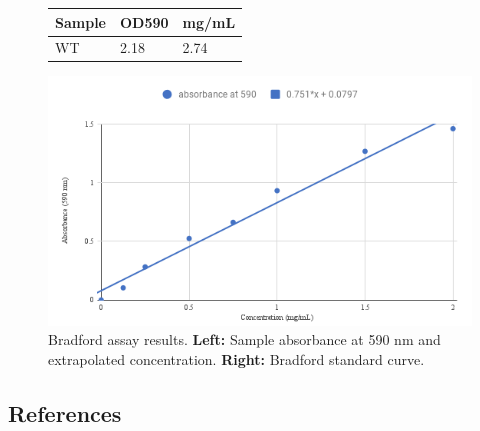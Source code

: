 \documentclass[journal=jacsat,manuscript=article]{achemso}
\begin{document}
\begin{figure}
  \centering
  \begin{minipage}{.4\textwidth}
    \begin{tabular}{lll}
      \hline
      Sample  & OD590 & mg/mL  \\
      \hline
      WT        & 2.18 & 2.74\\
      \hline
    \end{tabular}
  \end{minipage}
  \begin{minipage}{.59\textwidth}
    \includegraphics[width=\linewidth]{figures/bradford-standard-curve}
  \end{minipage}
  \caption{Bradford assay results. \textbf{Left:} Sample absorbance at 590 nm and extrapolated concentration. \textbf{Right:} Bradford standard curve.}
  \label{fig:bradford-assay}
\end{figure}

\subsection{References}

\begin{suppinfo}

\end{suppinfo}





\end{document}
